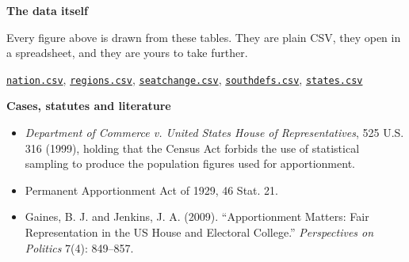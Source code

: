 \documentclass[
]{article}
\providecommand{\tightlist}{%
  \setlength{\itemsep}{0pt}\setlength{\parskip}{0pt}}
\begin{document}
\textbf{The data itself}

Every figure above is drawn from these tables. They are plain CSV, they
open in a spreadsheet, and they are yours to take further.

\href{data/derived/nation.csv}{\texttt{nation.csv}},
\href{data/derived/regions.csv}{\texttt{regions.csv}},
\href{data/derived/seatchange.csv}{\texttt{seatchange.csv}},
\href{data/derived/southdefs.csv}{\texttt{southdefs.csv}},
\href{data/derived/states.csv}{\texttt{states.csv}}

\textbf{Cases, statutes and literature}

\begin{itemize}
\tightlist
\item
  \emph{Department of Commerce v. United States House of
  Representatives}, 525 U.S. 316 (1999), holding that the Census Act
  forbids the use of statistical sampling to produce the population
  figures used for apportionment.
\item
  Permanent Apportionment Act of 1929, 46 Stat. 21.
\item
  Gaines, B. J. and Jenkins, J. A. (2009). ``Apportionment Matters: Fair
  Representation in the US House and Electoral College.''
  \emph{Perspectives on Politics} 7(4): 849--857.
\end{itemize}
\end{document}
